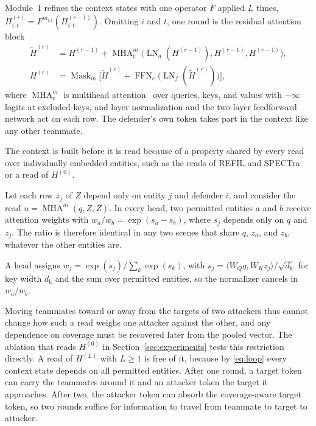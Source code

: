 Module~1 refines the context states with one operator $F$ applied $L$ times, $H^{(r)}_{i,t}=F^{m_{i,t}}(H^{(r-1)}_{i,t})$. Omitting $i$ and $t$, one round is the residual attention block
\begin{align}
\widetilde H^{(r)}&=H^{(r-1)}+\operatorname{MHA}^{m}_{\mathrm c}\big(\operatorname{LN}_a(H^{(r-1)}),H^{(r-1)},H^{(r-1)}\big),\nonumber\\
H^{(r)}&=\operatorname{Mask}_{m}\big[\widetilde H^{(r)}+\operatorname{FFN}_{\mathrm c}\big(\operatorname{LN}_f(\widetilde H^{(r)})\big)\big],
\label{eq:loop}
\end{align}
where $\operatorname{MHA}^{m}_{\mathrm c}$ is multihead attention~\cite{vaswani2017attention} over queries, keys, and values with $-\infty$ logits at excluded keys, and layer normalization and the two-layer feedforward network act on each row. The defender's own token takes part in the context like any other teammate.

The context is built before it is read because of a property shared by every read over individually embedded entities, such as the reads of REFIL and SPECTra~\cite{iqbal2021refil,park2026spectra} or a read of $H^{(0)}$.

\begin{proposition}
\label{prop:selection}
Let each row $z_j$ of $Z$ depend only on entity $j$ and defender $i$, and consider the read $u=\operatorname{MHA}^{m}(q,Z,Z)$. In every head, two permitted entities $a$ and $b$ receive attention weights with $w_a/w_b=\exp(s_a-s_b)$, where $s_j$ depends only on $q$ and $z_j$. The ratio is therefore identical in any two scenes that share $q$, $z_a$, and $z_b$, whatever the other entities are.
\end{proposition}

\begin{IEEEproof}
A head assigns $w_j=\exp(s_j)/\sum_k\exp(s_k)$, with $s_j=\langle W_Qq,W_Kz_j\rangle/\sqrt{d_{\mathrm k}}$ for key width $d_{\mathrm k}$ and the sum over permitted entities, so the normalizer cancels in $w_a/w_b$.
\end{IEEEproof}

Moving teammates toward or away from the targets of two attackers thus cannot change how such a read weighs one attacker against the other, and any dependence on coverage must be recovered later from the pooled vector. The ablation that reads $H^{(0)}$ in Section~\ref{sec:experiments} tests this restriction directly. A read of $H^{(L)}$ with $L\ge1$ is free of it, because by \eqref{eq:loop} every context state depends on all permitted entities. After one round, a target token can carry the teammates around it and an attacker token the target it approaches. After two, the attacker token can absorb the coverage-aware target token, so two rounds suffice for information to travel from teammate to target to attacker.

